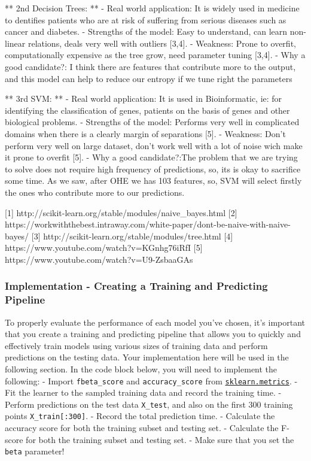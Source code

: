 \documentclass[11pt]{article}
\begin{document}
** 2nd Decision Trees: ** - Real world application: It is widely used in
medicine to dentifies patients who are at risk of suffering from serious
diseases such as cancer and diabetes. - Strengths of the model: Easy to
understand, can learn non-linear relations, deals very well with
outliers {[}3,4{]}. - Weakness: Prone to overfit, computationally
expensive as the tree grow, need parameter tuning {[}3,4{]}. - Why a
good candidate?: I think there are features that contribute more to the
output, and this model can help to reduce our entropy if we tune right
the parameters

** 3rd SVM: ** - Real world application: It is used in Bioinformatic,
ie: for identifying the classification of genes, patients on the basis
of genes and other biological problems. - Strengths of the model:
Performs very well in complicated domains when there is a clearly margin
of separations {[}5{]}. - Weakness: Don't perform very well on large
dataset, don't work well with a lot of noise wich make it prone to
overfit {[}5{]}. - Why a good candidate?:The problem that we are trying
to solve does not require high frequency of predictions, so, its is okay
to sacrifice some time. As we saw, after OHE we has 103 features, so,
SVM will select firstly the ones who contribute more to our predictions.

{[}1{]} http://scikit-learn.org/stable/modules/naive\_bayes.html {[}2{]}
https://workwiththebest.intraway.com/white-paper/dont-be-naive-with-naive-bayes/
{[}3{]} http://scikit-learn.org/stable/modules/tree.html {[}4{]}
https://www.youtube.com/watch?v=KGnhg76iRfI {[}5{]}
https://www.youtube.com/watch?v=U9-ZsbaaGAs

    \subsubsection{Implementation - Creating a Training and Predicting
Pipeline}\label{implementation---creating-a-training-and-predicting-pipeline}

To properly evaluate the performance of each model you've chosen, it's
important that you create a training and predicting pipeline that allows
you to quickly and effectively train models using various sizes of
training data and perform predictions on the testing data. Your
implementation here will be used in the following section. In the code
block below, you will need to implement the following: - Import
\texttt{fbeta\_score} and \texttt{accuracy\_score} from
\href{http://scikit-learn.org/stable/modules/classes.html\#sklearn-metrics-metrics}{\texttt{sklearn.metrics}}.
- Fit the learner to the sampled training data and record the training
time. - Perform predictions on the test data \texttt{X\_test}, and also
on the first 300 training points \texttt{X\_train{[}:300{]}}. - Record
the total prediction time. - Calculate the accuracy score for both the
training subset and testing set. - Calculate the F-score for both the
training subset and testing set. - Make sure that you set the
\texttt{beta} parameter!
\end{document}

